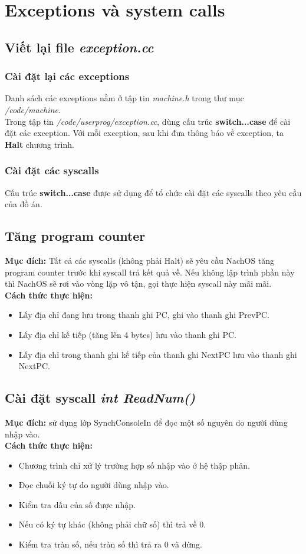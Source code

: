 \section{Exceptions và system calls}
\subsection{Viết lại file \textit{exception.cc}}
\subsubsection{Cài đặt lại các exceptions}
Danh sách các exceptions nằm ở tập tin \textit{machine.h} trong thư mục \textit{/code/machine}.\\
Trong tập tin \textit{/code/userprog/exception.cc}, dùng cấu trúc \textbf{switch...case} để cài đặt các exception. Với mỗi exception, sau khi đưa thông báo về exception, ta \textbf{Halt} chương trình.
\subsubsection{Cài đặt các syscalls}
Cấu trúc \textbf{switch...case} được sử dụng để tổ chức cài đặt các syscalls theo yêu cầu của đồ án.

\subsection{Tăng program counter}
\textbf{Mục đích:} Tất cả các syscalls (không phải Halt) sẽ yêu cầu NachOS tăng program counter trước khi syscall trả kết quả về. Nếu không lập trình phần này thì NachOS sẽ rơi vào vòng lặp vô tận, gọi thực hiện syscall này mãi mãi.\\
\textbf{Cách thức thực hiện:}
\begin{itemize}
\item Lấy địa chỉ đang lưu trong thanh ghi PC, ghi vào thanh ghi PrevPC.
\item Lấy địa chỉ kế tiếp (tăng lên 4 bytes) lưu vào thanh ghi PC.
\item Lấy địa chỉ trong thanh ghi kế tiếp của thanh ghi NextPC lưu vào thanh ghi NextPC.
\end{itemize}

\subsection{Cài đặt syscall \textit{int ReadNum()}}
\textbf{Mục đích:} sử dụng lớp SynchConsoleIn để đọc một số nguyên do người dùng nhập vào.\\
\textbf{Cách thức thực hiện:}
\begin{itemize}
\item Chương trình chỉ xử lý trường hợp số nhập vào ở hệ thập phân.
\item Đọc chuỗi ký tự do người dùng nhập vào.
\item Kiểm tra dấu của số được nhập.
\item Nếu có ký tự khác (không phải chữ số) thì trả về 0.
\item Kiểm tra tràn số, nếu tràn số thì trả ra 0 và dừng.
\end{itemize}